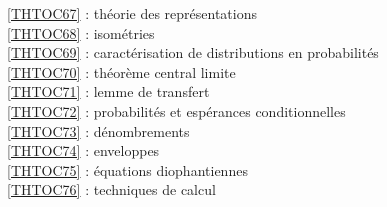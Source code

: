 \ref {THTOC67} : théorie des représentations\\
\ref {THTOC68} : isométries\\
\ref {THTOC69} : caractérisation de distributions en probabilités\\
\ref {THTOC70} : théorème central limite\\
\ref {THTOC71} : lemme de transfert\\
\ref {THTOC72} : probabilités et espérances conditionnelles\\
\ref {THTOC73} : dénombrements\\
\ref {THTOC74} : enveloppes\\
\ref {THTOC75} : équations diophantiennes\\
\ref {THTOC76} : techniques de calcul\\
